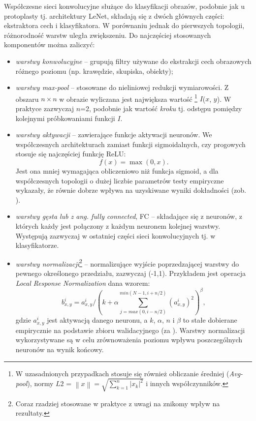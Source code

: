 Współczesne sieci konwolucyjne służące do klasyfikacji obrazów, podobnie jak u protoplasty tj. architektury LeNet, składają się z dwóch głównych części: ekstraktora cech i klasyfikatora. W porównaniu jednak do pierwszych topologii, różnorodność warstw uległa zwiększeniu. Do najczęściej stosowanych komponentów można zaliczyć:
\begin{itemize}
	\item \textit{warstwy konwolucyjne} -- grupują filtry używane do ekstrakcji cech obrazowych różnego poziomu (np. krawędzie, skupiska, obiekty);
	\item \textit{warstwy max-pool} -- stosowane do nieliniowej redukcji wymiarowości. Z obszaru $n\times$$n$ w obrazie wyliczana jest największa wartość \footnote{W uzasadnionych przypadkach stosuje się również obliczanie średniej (\textit{Avg-pool}), normy $L2$ = $\left \| x \right \| = \sqrt{\sum_{k=1}^{n}\left |x_k  \right |^2}$ i innych współczynników.} $I$($x$, $y$). W praktyce zazwyczaj $n$=2, podobnie jak wartość \textit{kroku} tj. odstępu pomiędzy kolejnymi próbkowaniami funkcji $I$.
	\item \textit{warstwy aktywacji} -- zawierające funkcje aktywacji neuronów. We współczesnych architekturach zamiast funkcji sigmoidalnych, czy progowych stosuje się najczęściej funkcję ReLU:
	\begin{equation}
		f(x) = \max(0, x).
	\end{equation}
	Jest ona mniej wymagająca obliczeniowo niż funkcja sigmoid, a dla współczesnych topologii o dużej liczbie parametrów testy empiryczne wykazały, że równie dobrze wpływa na uzyskiwane wyniki dokładności (zob. \cite{Krizhevsky2012}). 
	\item \textit{warstwy gęsta lub z ang. fully connected}, FC -- składające się z neuronów, z których każdy jest połączony z każdym neuronem kolejnej warstwy. Występują zazwyczaj w ostatniej części sieci konwolucyjnych tj. w klasyfikatorze.
	\item \textit{warstwy normalizacji}\footnote{Coraz rzadziej stosowane w praktyce z uwagi na znikomy wpływ na rezultaty.} -- normalizujące wyjście poprzedzającej warstwy do pewnego określonego przedziału, zazwyczaj (-1,1). Przykładem jest operacja \textit{Local Response Normalization} dana wzorem:
	\begin{equation}
	\label{DLnormEquation}
	b_{x,y}^{i} = a_{x,y}^{i}/\left ( k + \alpha \sum_{j=max(0,i-n/2)}^{min(N-1,i+n/2)}(a_{x,y}^{i})^2 \right )^\beta,
	\end{equation}
	gdzie $a_{x,y}^{i}$ jest aktywacją danego neuronu, a $k$, $\alpha$, $n$ i $\beta$ to stałe dobierane empirycznie na podstawie zbioru walidacyjnego (za \cite{Krizhevsky2012}). Warstwy normalizacji wykorzystywane są w celu zrównoważenia poziomu wpływu poszczególnych neuronów na wynik końcowy.
\end{itemize}

